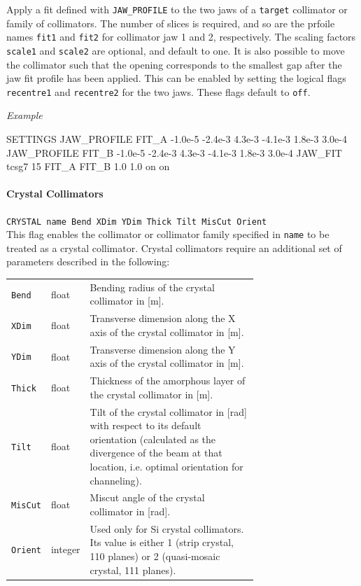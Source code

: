 Apply a fit defined with \texttt{JAW\_PROFILE} to the two jaws of a \texttt{target} collimator or family of collimators.
The number of slices is required, and so are the prfoile names \texttt{fit1} and \texttt{fit2} for collimator jaw 1 and 2, respectively.
The scaling factors \texttt{scale1} and \texttt{scale2} are optional, and default to one.
It is also possible to move the collimator such that the opening corresponds to the smallest gap after the jaw fit profile has been applied.
This can be enabled by setting the logical flags \texttt{recentre1} and \texttt{recentre2} for the two jaws.
These flags default to \texttt{off}.

\bigskip
\noindent\textit{Example}
\begin{cverbatim}
SETTINGS
JAW_PROFILE FIT_A -1.0e-5 -2.4e-3 4.3e-3 -4.1e-3 1.8e-3 3.0e-4
JAW_PROFILE FIT_B -1.0e-5 -2.4e-3 4.3e-3 -4.1e-3 1.8e-3 3.0e-4
JAW_FIT tcsg7 15 FIT_A FIT_B 1.0 1.0 on on
\end{cverbatim}

\paragraph{Crystal Collimators} \texttt{CRYSTAL name Bend XDim YDim Thick Tilt MisCut Orient}\\

This flag enables the collimator or collimator family specified in \texttt{name} to be treated as a crystal collimator.
Crystal collimators require an additional set of parameters described in the following:

\bigskip
\begin{tabular}{@{}llp{0.7\linewidth}}
    \texttt{Bend}   & float   & Bending radius of the crystal collimator in [m]. \\
    \texttt{XDim}   & float   & Transverse dimension along the X axis of the crystal collimator in [m]. \\
    \texttt{YDim}   & float   & Transverse dimension along the Y axis of the crystal collimator in [m]. \\
    \texttt{Thick}  & float   & Thickness of the amorphous layer of the crystal collimator in [m]. \\
    \texttt{Tilt}   & float   & Tilt of the crystal collimator in [rad] with respect to its default orientation (calculated as the divergence of the beam at that location, i.e. optimal orientation for channeling). \\
    \texttt{MisCut} & float   & Miscut angle of the crystal collimator in [rad]. \\
    \texttt{Orient} & integer & Used only for Si crystal collimators. Its value is either 1 (strip crystal, 110 planes) or 2 (quasi-mosaic crystal, 111 planes). \\
\end{tabular}

